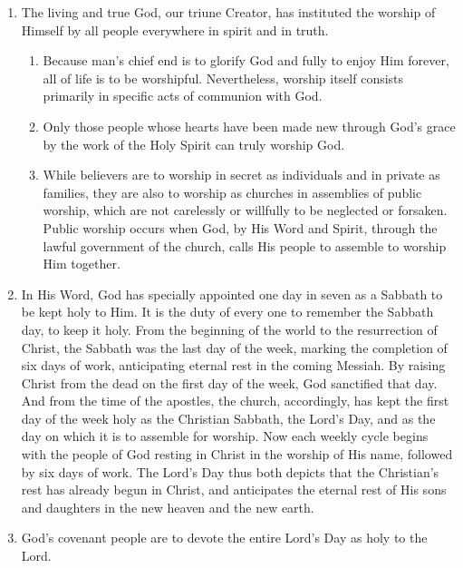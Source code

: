 \documentclass[
]{book}
\providecommand{\tightlist}{%
  \setlength{\itemsep}{0pt}\setlength{\parskip}{0pt}}
\begin{document}
\protect\hypertarget{chapter-slug-51-gods-institution-of-public-worship}{\href{}{}}

\begin{enumerate}
\def\labelenumi{\arabic{enumi}.}
\tightlist
\item
  \protect\hypertarget{51}{\href{}{}}The living and true God, our triune Creator, has instituted the worship of Himself by all people everywhere in spirit and in truth.

  \begin{enumerate}
  \def\labelenumii{\alph{enumii}.}
  \tightlist
  \item
    Because man's chief end is to glorify God and fully to enjoy Him forever, all of life is to be worshipful. Nevertheless, worship itself consists primarily in specific acts of communion with God.
  \item
    Only those people whose hearts have been made new through God's grace by the work of the Holy Spirit can truly worship God.
  \item
    While believers are to worship in secret as individuals and in private as families, they are also to worship as churches in assemblies of public worship, which are not carelessly or willfully to be neglected or forsaken. Public worship occurs when God, by His Word and Spirit, through the lawful government of the church, calls His people to assemble to worship Him together.
  \end{enumerate}
\item
  In His Word, God has specially appointed one day in seven as a Sabbath to be kept holy to Him. It is the duty of every one to remember the Sabbath day, to keep it holy. From the beginning of the world to the resurrection of Christ, the Sabbath was the last day of the week, marking the completion of six days of work, anticipating eternal rest in the coming Messiah. By raising Christ from the dead on the first day of the week, God sanctified that day. And from the time of the apostles, the church, accordingly, has kept the first day of the week holy as the Christian Sabbath, the Lord's Day, and as the day on which it is to assemble for worship. Now each weekly cycle begins with the people of God resting in Christ in the worship of His name, followed by six days of work. The Lord's Day thus both depicts that the Christian's rest has already begun in Christ, and anticipates the eternal rest of His sons and daughters in the new heaven and the new earth.
\item
  God's covenant people are to devote the entire Lord's Day as holy to the Lord.


\end{enumerate}
\end{document}
